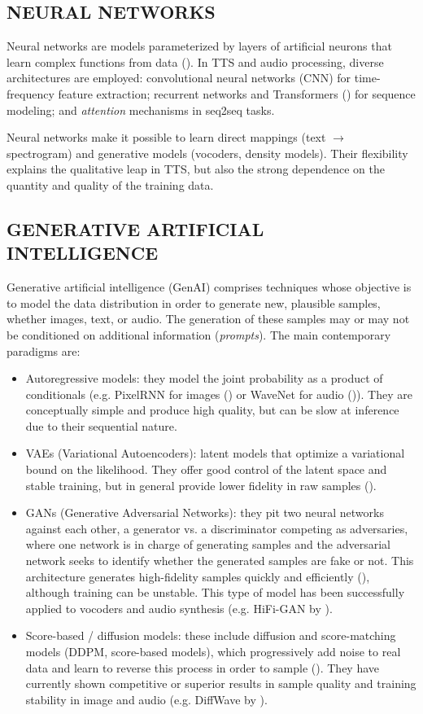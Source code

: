 \subsection{NEURAL NETWORKS}
Neural networks are models parameterized by layers of artificial neurons that learn complex functions from data (\cite{goodfellow}).
In TTS and audio processing, diverse architectures are employed: convolutional neural networks (CNN) for time-frequency feature extraction; recurrent networks and Transformers (\cite{attention}) for sequence modeling; and \emph{attention} mechanisms in seq2seq tasks.

Neural networks make it possible to learn direct mappings (text $\rightarrow$ spectrogram) and generative models (vocoders, density models). Their flexibility explains the qualitative leap in TTS, but also the strong dependence on the quantity and quality of the training data.

\subsection{GENERATIVE ARTIFICIAL INTELLIGENCE}
Generative artificial intelligence (GenAI) comprises techniques whose objective is to model the data distribution in order to generate new, plausible samples, whether images, text, or audio. The generation of these samples may or may not be conditioned on additional information (\emph{prompts}). The main contemporary paradigms are:


\begin{itemize}
\item Autoregressive models: they model the joint probability as a product of conditionals (e.g. PixelRNN for images (\cite{pixel_rnn}) or WaveNet for audio (\cite{wavenet})). They are conceptually simple and produce high quality, but can be slow at inference due to their sequential nature.
\item VAEs (Variational Autoencoders): latent models that optimize a variational bound on the likelihood. They offer good control of the latent space and stable training, but in general provide lower fidelity in raw samples (\cite{vaes}).
\item GANs (Generative Adversarial Networks): they pit two neural networks against each other, a generator vs. a discriminator competing as adversaries, where one network is in charge of generating samples and the adversarial network seeks to identify whether the generated samples are fake or not. This architecture generates high-fidelity samples quickly and efficiently (\cite{gans_ian}), although training can be unstable. This type of model has been successfully applied to vocoders and audio synthesis (e.g. HiFi-GAN by \cite{hifigan}).
\item Score-based / diffusion models: these include diffusion and score-matching models (DDPM, score-based models), which progressively add noise to real data and learn to reverse this process in order to sample (\cite{ddpm_diff}). They have currently shown competitive or superior results in sample quality and training stability in image and audio (e.g. DiffWave by \cite{diffWave}).
\end{itemize}

